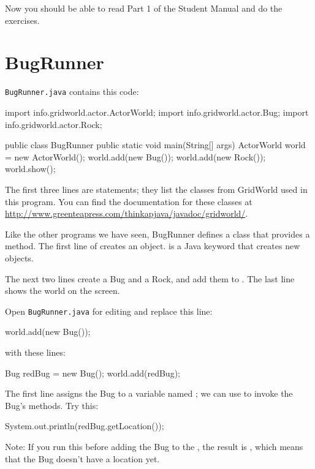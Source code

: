 Now you should be able to read Part 1 of the Student Manual and do the exercises.


\section{BugRunner}

{\tt BugRunner.java} contains this code:

\begin{code}
import info.gridworld.actor.ActorWorld;
import info.gridworld.actor.Bug;
import info.gridworld.actor.Rock;

public class BugRunner
{
    public static void main(String[] args)
    {
        ActorWorld world = new ActorWorld();
        world.add(new Bug());
        world.add(new Rock());
        world.show();
    }
}
\end{code}

The first three lines are  statements; they list the classes from GridWorld used in this program.
You can find the documentation for these classes at \url{http://www.greenteapress.com/thinkapjava/javadoc/gridworld/}.

Like the other programs we have seen, BugRunner defines a class that provides a  method.
The first line of  creates an  object.
 is a Java keyword that creates new objects.

The next two lines create a Bug and a Rock, and add them to .
The last line shows the world on the screen.

Open {\tt BugRunner.java} for editing and replace this line:

\begin{code}
    world.add(new Bug());
\end{code}

with these lines:

\begin{code}
    Bug redBug = new Bug();
    world.add(redBug);
\end{code}

The first line assigns the Bug to a variable named ; we can use  to invoke the Bug's methods.
Try this:

\begin{code}
    System.out.println(redBug.getLocation());
\end{code}

Note: If you run this before adding the Bug to the , the result is , which means that the Bug doesn't have a location yet.

